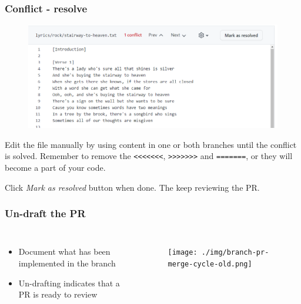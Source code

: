 \documentclass[aspectratio=169]{beamer} %
\begin{document}
\begin{frame}
	\frametitle{Conflict - resolve}
	

	\begin{minipage}[t][5cm][t]{\textwidth}
		\begin{figure}
			\centering
			\includegraphics[width=.55\textwidth]{./img/conflict-img-resolve-2.png}
		\end{figure}
	\end{minipage}
	
	\vspace{-1.5cm}
	
	\begin{minipage}[t][5cm][t]{\textwidth}
		
		Edit the file manually by using content in one or both branches until the conflict is solved. 
		Remember to remove the \texttt{<<<<<<<}, \texttt{>>>>>>>} and \texttt{=======},
		or they will become a part of your code.
		
		\vspace{.5cm}
		
		Click \textit{Mark as resolved} button when done. The keep reviewing the PR.
		
	\end{minipage}
\end{frame}


\begin{frame}
	\frametitle{Un-draft the PR}
	\begin{columns}[c]
		
		\begin{itemize}
			\setlength\itemsep{1em}
			\item Document what has been implemented in the branch
			\item Un-drafting indicates that a PR is ready to review
		\end{itemize}
		
		\vspace{-.75cm}
		\begin{figure}
			\centering
			\texttt{[image: ./img/branch-pr-merge-cycle-old.png]}
		\end{figure}
		
	\end{columns}
\end{frame}
\end{document}
